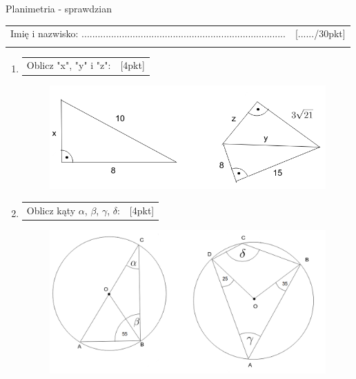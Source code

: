 \documentclass[12pt,a4paper]{article}
\begin{document}
	\begin{center}
		\LARGE Planimetria - sprawdzian
	\end{center}
	\vspace{1.5cm}
	\begin{tabular}{p{13cm} r}
		Imię i nazwisko: ............................................................................
		&[....../30pkt]\\ 
		\vspace{0.5cm}
	\end{tabular}
	\begin{enumerate}[1.]
		\item  \begin{tabular}{p{13cm} r}	%
			Oblicz "x", "y" i "z": &[4pkt]\\ 
		\end{tabular}
		\begin{figure}[h]
			\includegraphics[scale=0.8]{tp1}
		\end{figure}
	
		\item  \begin{tabular}{p{13cm} r}	%
			Oblicz kąty $\alpha$, $\beta$, $\gamma$, $\delta$: &[4pkt]\\ 
		\end{tabular}
		\begin{figure}[h]
			\includegraphics[scale=0.4]{p2}
		\end{figure}
		

\end{enumerate}
\end{document}
